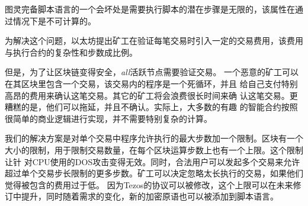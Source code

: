 \documentclass[letterpaper]{article}
\begin{document}
图灵完备脚本语言的一个会坏处是需要执行脚本的潜在步骤是无限的，该属性在通过情况下是不可计算的。

为解决这个问题，以太坊提出矿工在验证每笔交易时引入一定的交易费用，该费用与执行合约的复杂性和步数成比例。

但是，为了让区块链变得安全，\emph{all}活跃节点需要验证交易。
一个恶意的矿工可以在其区块里包含一个交易，该交易内的程序是一个死循环，并且
给自己支付特别高昂的费用来确认这笔交易。其它的矿工将会浪费很长时间来确
认这笔交易。更糟糕的是，他们可以拖延，并且不确认。实际上，大多数的有趣
的智能合约按照很简单的商业逻辑进行实现，并不需要特别复杂的计算。

我们的解决方案是对单个交易中程序允许执行的最大步数加一个限制。区块有一个大小的限制，用于限制交易数量，在每个区块运算步数上也有一个上限。这个限制让针
对CPU使用的DOS攻击变得无效。同时，合法用户可以发起多个交易来允许超过单个交易步长限制的更多步数。矿工可以决定忽略太长执行的交易，如果他们觉得被包含的费用过于低。
因为Tezos的协议可以被修改，这个上限可以在未来修订中提升，同时随着需求的变化，新的加密原语也可以被添加到脚本语言。
\end{document}

